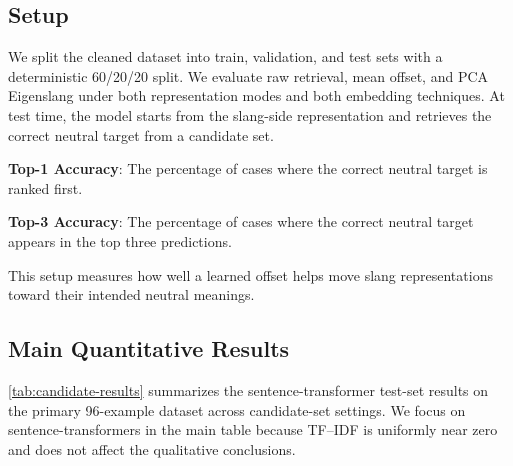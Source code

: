 \documentclass{article}
\begin{document}
\subsection{Setup}
We split the cleaned dataset into train, validation, and test sets with a deterministic 60/20/20 split. We evaluate raw retrieval, mean offset, and PCA Eigenslang under both representation modes and both embedding techniques. At test time, the model starts from the slang-side representation and retrieves the correct neutral target from a candidate set.

\textbf{Top-1 Accuracy}: The percentage of cases where the correct neutral target is ranked first.

\textbf{Top-3 Accuracy}: The percentage of cases where the correct neutral target appears in the top three predictions.

This setup measures how well a learned offset helps move slang representations toward their intended neutral meanings.

\subsection{Main Quantitative Results}
\cref{tab:candidate-results} summarizes the sentence-transformer test-set results on the primary 96-example dataset across candidate-set settings.
We focus on sentence-transformers in the main table because TF--IDF is uniformly near zero and does not affect the qualitative conclusions.
\end{document}
